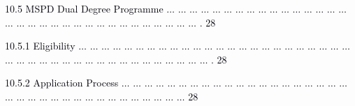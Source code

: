 \documentclass[12pt]{article}
\begin{document}
\vspace{\baselineskip}
\begin{adjustwidth}{0.21in}{0.0in}
{\fontsize{7pt}{8.4pt}\selectfont \textcolor[HTML]{00000A}{10.5 MSPD Dual Degree Programme $ \ldots $ $ \ldots $ $ \ldots $ $ \ldots $ $ \ldots $ $ \ldots $ $ \ldots $ $ \ldots $ $ \ldots $ $ \ldots $ $ \ldots $ $ \ldots $ $ \ldots $ $ \ldots $ $ \ldots $ $ \ldots $ $ \ldots $ $ \ldots $ $ \ldots $ $ \ldots $ $ \ldots $ $ \ldots $ $ \ldots $ $ \ldots $ $ \ldots $ $ \ldots $ $ \ldots $ $ \ldots $ $ \ldots $ $ \ldots $ $ \ldots $ $ \ldots $ $ \ldots $ . 28}\par}\par

\end{adjustwidth}


\vspace{\baselineskip}
\begin{adjustwidth}{0.5in}{0.0in}
{\fontsize{7pt}{8.4pt}\selectfont \textcolor[HTML]{00000A}{10.5.1 Eligibility $ \ldots $ $ \ldots $ $ \ldots $ $ \ldots $ $ \ldots $ $ \ldots $ $ \ldots $ $ \ldots $ $ \ldots $ $ \ldots $ $ \ldots $ $ \ldots $ $ \ldots $ $ \ldots $ $ \ldots $ $ \ldots $ $ \ldots $ $ \ldots $ $ \ldots $ $ \ldots $ $ \ldots $ $ \ldots $ $ \ldots $ $ \ldots $ $ \ldots $ $ \ldots $ $ \ldots $ $ \ldots $ $ \ldots $ $ \ldots $ $ \ldots $ $ \ldots $ $ \ldots $ $ \ldots $ $ \ldots $ $ \ldots $ $ \ldots $ $ \ldots $ $ \ldots $ $ \ldots $ $ \ldots $ $ \ldots $ . 28}\par}\par

\end{adjustwidth}


\vspace{\baselineskip}
\begin{adjustwidth}{0.5in}{0.0in}
{\fontsize{7pt}{8.4pt}\selectfont \textcolor[HTML]{00000A}{10.5.2 Application Process $ \ldots $ $ \ldots $ $ \ldots $ $ \ldots $ $ \ldots $ $ \ldots $ $ \ldots $ $ \ldots $ $ \ldots $ $ \ldots $ $ \ldots $ $ \ldots $ $ \ldots $ $ \ldots $ $ \ldots $ $ \ldots $ $ \ldots $ $ \ldots $ $ \ldots $ $ \ldots $ $ \ldots $ $ \ldots $ $ \ldots $ $ \ldots $ $ \ldots $ $ \ldots $ $ \ldots $ $ \ldots $ $ \ldots $ $ \ldots $ $ \ldots $ $ \ldots $ $ \ldots $ $ \ldots $ $ \ldots $ $ \ldots $  28}\par}\par

\end{adjustwidth}
\end{document}
